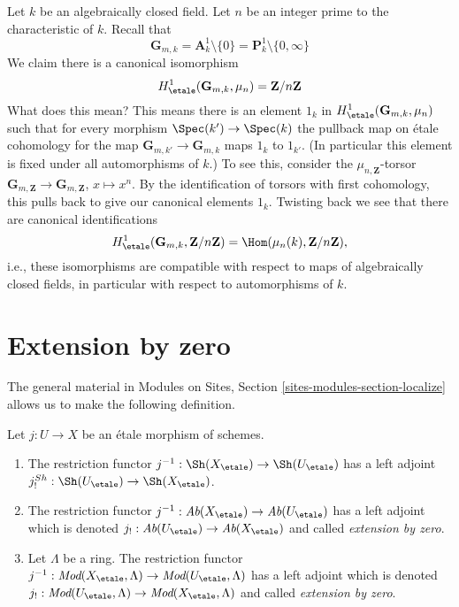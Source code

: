\begin{remark}
\label{remark-normalize-H1-Gm}
Let $k$ be an algebraically closed field. Let $n$ be an integer prime to
the characteristic of $k$. Recall that
$$
\mathbf{G}_{m, k} = \mathbf{A}^1_k \setminus \{0\} =
\mathbf{P}^1_k \setminus \{0, \infty\}
$$
We claim there is a canonical isomorphism
$$
H^1_\etale(\mathbf{G}_{m, k}, \mu_n) = \mathbf{Z}/n\mathbf{Z}
$$
What does this mean? This means there is an element $1_k$ in
$H^1_\etale(\mathbf{G}_{m, k}, \mu_n)$ such that for
every morphism $\Spec(k') \to \Spec(k)$ the pullback map on
\'etale cohomology for the map $\mathbf{G}_{m, k'} \to \mathbf{G}_{m, k}$
maps $1_k$ to $1_{k'}$. (In particular this element is
fixed under all automorphisms of $k$.) To see this, consider the
$\mu_{n, \mathbf{Z}}$-torsor
$\mathbf{G}_{m, \mathbf{Z}} \to \mathbf{G}_{m, \mathbf{Z}}$,
$x \mapsto x^n$. By the identification of torsors with
first cohomology, this pulls back to give our canonical elements $1_k$.
Twisting back we see that there are canonical identifications
$$
H^1_\etale(\mathbf{G}_{m, k}, \mathbf{Z}/n\mathbf{Z}) =
\Hom(\mu_n(k), \mathbf{Z}/n\mathbf{Z}),
$$
i.e., these isomorphisms are compatible with respect to maps of
algebraically closed fields, in particular with respect to
automorphisms of $k$.
\end{remark}










\section{Extension by zero}
\label{section-extension-by-zero}

\noindent
The general material in
Modules on Sites, Section \ref{sites-modules-section-localize}
allows us to make the following definition.

\begin{definition}
\label{definition-extension-zero}
Let $j : U \to X$ be an \'etale morphism of schemes.
\begin{enumerate}
\item The restriction functor
$j^{-1} : \Sh(X_\etale) \to \Sh(U_\etale)$
has a left adjoint
$j_!^{Sh} : \Sh(U_\etale) \to \Sh(X_\etale)$.
\item The restriction functor
$j^{-1} : \textit{Ab}(X_\etale) \to \textit{Ab}(U_\etale)$
has a left adjoint which is denoted
$j_! : \textit{Ab}(U_\etale) \to \textit{Ab}(X_\etale)$
and called {\it extension by zero}.
\item Let $\Lambda$ be a ring. The restriction functor
$j^{-1} : \textit{Mod}(X_\etale, \Lambda) \to
\textit{Mod}(U_\etale, \Lambda)$
has a left adjoint which is denoted
$j_! : \textit{Mod}(U_\etale, \Lambda) \to
\textit{Mod}(X_\etale, \Lambda)$
and called {\it extension by zero}.
\end{enumerate}
\end{definition}

